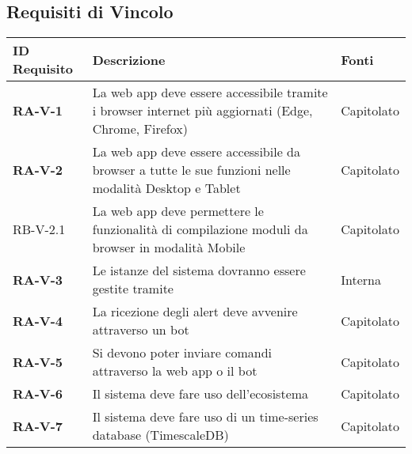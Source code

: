 	
	\subsection{Requisiti di Vincolo}

	\begin{center}
		\begin{longtable}{|p{3cm}|p{9.85cm}|p{2cm}|}
		\hline
		\rowcolor{blue_requisiti}
		{\color{white} \textbf{ID Requisito} } & {\color{white} \textbf{Descrizione} } & {\color{white} \textbf{Fonti} } \\ 
		\hline
		\endhead

		\textbf{RA-V-1} & La web app deve essere accessibile tramite i browser internet più aggiornati (Edge, Chrome, Firefox) & Capitolato \\ \hline
		\textbf{RA-V-2} & La web app deve essere accessibile da browser a tutte le sue funzioni nelle modalità Desktop e Tablet & Capitolato \\ \hline
		{\color{gray} RB-V-}2.1 & La web app deve permettere le funzionalità di compilazione moduli da browser in modalità Mobile & Capitolato \\ \hline
		\textbf{RA-V-3} & Le istanze del sistema dovranno essere gestite tramite \glock{Docker} & Interna \\ \hline
		\textbf{RA-V-4} & La ricezione degli alert deve avvenire attraverso un bot \glock{Telegram} & Capitolato \\ \hline
		\textbf{RA-V-5} & Si devono poter inviare comandi attraverso la web app o il bot \glock{Telegram} & Capitolato \\ \hline
		\textbf{RA-V-6} & Il sistema deve fare uso dell'ecosistema \glock{Kafka} & Capitolato \\ \hline
		\textbf{RA-V-7} & Il sistema deve fare uso di un time-series database (TimescaleDB) & Capitolato \\ \hline


		\end{longtable}
	\end{center}
